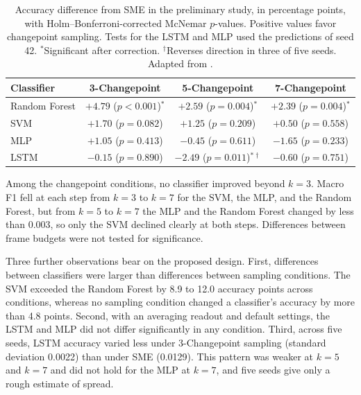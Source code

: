 \begin{table}[t]
   \centering
   \caption[Accuracy difference from SME in the preliminary study]{Accuracy difference from SME in the preliminary study, in percentage points, with Holm--Bonferroni-corrected McNemar $p$-values. Positive values favor changepoint sampling. Tests for the LSTM and MLP used the predictions of seed 42. $^{*}$Significant after correction. $^{\dagger}$Reverses direction in three of five seeds. Adapted from .}
   \label{tab:prelim-mcnemar}
   \small
   \begin{tabular}{lccc}
      \toprule
      Classifier & 3-Changepoint & 5-Changepoint & 7-Changepoint \\
      \midrule
      Random Forest & $+4.79$ ($p < 0.001$)$^{*}$ & $+2.59$ ($p = 0.004$)$^{*}$ & $+2.39$ ($p = 0.004$)$^{*}$ \\
      SVM & $+1.70$ ($p = 0.082$) & $+1.25$ ($p = 0.209$) & $+0.50$ ($p = 0.558$) \\
      MLP & $+1.05$ ($p = 0.413$) & $-0.45$ ($p = 0.611$) & $-1.65$ ($p = 0.233$) \\
      LSTM & $-0.15$ ($p = 0.890$) & $-2.49$ ($p = 0.011$)$^{*\dagger}$ & $-0.60$ ($p = 0.751$) \\
      \bottomrule
   \end{tabular}
\end{table}

Among the changepoint conditions, no classifier improved beyond $k = 3$. Macro F1 fell at each step from $k = 3$ to $k = 7$ for the SVM, the MLP, and the Random Forest, but from $k = 5$ to $k = 7$ the MLP and the Random Forest changed by less than 0.003, so only the SVM declined clearly at both steps. Differences between frame budgets were not tested for significance.

Three further observations bear on the proposed design. First, differences between classifiers were larger than differences between sampling conditions. The SVM exceeded the Random Forest by 8.9 to 12.0 accuracy points across conditions, whereas no sampling condition changed a classifier's accuracy by more than 4.8 points. Second, with an averaging readout and default settings, the LSTM and MLP did not differ significantly in any condition. Third, across five seeds, LSTM accuracy varied less under 3-Changepoint sampling (standard deviation 0.0022) than under SME (0.0129). This pattern was weaker at $k = 5$ and $k = 7$ and did not hold for the MLP at $k = 7$, and five seeds give only a rough estimate of spread.

